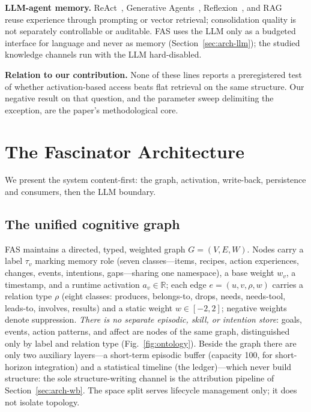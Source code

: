 \documentclass[10pt,a4paper]{article}
\begin{document}
\textbf{LLM-agent memory.} ReAct~\citep{yao2023react}, Generative Agents~\citep{park2023generative}, Reflexion~\citep{shinn2023reflexion}, and RAG~\citep{lewis2020rag} reuse experience through prompting or vector retrieval; consolidation quality is not separately controllable or auditable. FAS uses the LLM only as a budgeted interface for language and never as memory (Section~\ref{sec:arch-llm}); the studied knowledge channels run with the LLM hard-disabled.

\textbf{Relation to our contribution.} None of these lines reports a preregistered test of whether activation-based access beats flat retrieval on the same structure. Our negative result on that question, and the parameter sweep delimiting the exception, are the paper's methodological core.

\section{The Fascinator Architecture}
\label{sec:arch}

We present the system content-first: the graph, activation, write-back, persistence and consumers, then the LLM boundary.

\subsection{The unified cognitive graph}
\label{sec:arch-graph}
FAS maintains a directed, typed, weighted graph $G=(V,E,W)$. Nodes carry a label $\tau_v$ marking memory role (seven classes---items, recipes, action experiences, changes, events, intentions, gaps---sharing one namespace), a base weight $w_v$, a timestamp, and a runtime activation $a_v\in\mathbb{R}$; each edge $e=(u,v,\rho,w)$ carries a relation type $\rho$ (eight classes: produces, belongs-to, drops, needs, needs-tool, leads-to, involves, results) and a static weight $w\in[-2,2]$; negative weights denote suppression. \emph{There is no separate episodic, skill, or intention store}: goals, events, action patterns, and affect are nodes of the same graph, distinguished only by label and relation type (Fig.~\ref{fig:ontology}). Beside the graph there are only two auxiliary layers---a short-term episodic buffer (capacity 100, for short-horizon integration) and a statistical timeline (the ledger)---which never build structure: the sole structure-writing channel is the attribution pipeline of Section~\ref{sec:arch-wb}. The space split serves lifecycle management only; it does not isolate topology.
\end{document}
